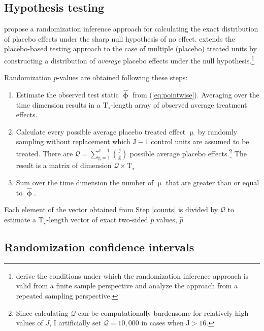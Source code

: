 \documentclass[hidelinks,12pt]{article}
\begin{document}
\begin{appendices}
\clearpage
\section{Hypothesis testing} \label{eval}

\citet{abadie2010synthetic} propose a randomization inference approach for calculating the exact distribution of placebo effects under the sharp null hypothesis of no effect. \citet{cavallo2013catastrophic} extends the placebo-based testing approach to the case of multiple (placebo) treated units by constructing a distribution of \emph{average} placebo effects under the null hypothesis.\footnote{\citet{firpo2018synthetic} derive the conditions under which the randomization inference approach is valid from a finite sample perspective and \citet{hahn2017synthetic} analyze the approach from a repeated sampling perspective.} 

Randomization $p$-values are obtained following these steps:

\begin{enumerate} 
	\item Estimate the observed test static $\boldsymbol{\hat{\upphi}}$ from (\ref{eq:pointwise}). Averaging over the time dimension results in a $\text{T}_\star$-length array of observed average treatment effects. 
	\item Calculate every possible average placebo treated effect $\upmu$ by randomly sampling without replacement which $\text{J}-1$ control units are assumed to be treated. There are $\mathcal{Q} = \sum\limits_{\text{g}=1}^{\text{J}-1} {\text{J} \choose \text{g}}$ possible average placebo effects.\footnote{Since calculating $\mathcal{Q}$ can be computationally burdensome for relatively high values of $J$, I artificially set $\mathcal{Q} = 10,000$ in cases when $\text{J} > 16$.} The result is a matrix of dimension $\mathcal{Q} \times \text{T}_\star$
	\item Sum over the time dimension the number of $\upmu$ that are greater than or equal to $\boldsymbol{\hat{\upphi}}$.  \label{counts}
\end{enumerate}

Each element of the vector obtained from Step \ref{counts} is divided by $\mathcal{Q}$ to estimate a $\text{T}_\star$-length vector of exact two-sided $p$ values, $\hat{p}$. 

\subsection{Randomization confidence intervals}


\end{appendices}
\end{document}
